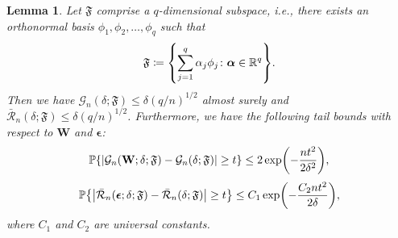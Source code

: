 \documentclass[11pt]{article}
\newtheorem{lemma}[theorem]{Lemma}
\newcommand{\bW}{\mathbf{W}}
\newcommand{\balpha}{\boldsymbol{\alpha}}
\newcommand{\beps}{\boldsymbol{\epsilon}}
\DeclarePairedDelimiter{\braces}{\lbrace}{\rbrace}
\DeclarePairedDelimiter{\paren}{(}{)}
\DeclarePairedDelimiter{\abs}{|}{|}
\newcommand{\R}{\mathbb{R}}
\renewcommand{\P}{\mathbb{P}}
\newcommand{\nsamples}{n}
\newcommand{\funcclass}{\mathfrak{F}}
\begin{document}
\begin{lemma}
\label{lem:linear_subspace_complexity}
    Let $\funcclass$ comprise a $q$-dimensional subspace, i.e., there exists an orthonormal basis $\phi_1,\phi_2,\ldots,\phi_q$ such that
    \begin{equation}
        \funcclass \coloneqq \braces*{\sum_{j=1}^q \alpha_j \phi_j \colon \balpha \in \R^q}.
    \end{equation}
    Then we have $\mathcal{G}_n(\delta;\funcclass) \leq \delta(q/\nsamples)^{1/2}$ almost surely and $\bar{\mathcal{R}}_n(\delta;\funcclass) \leq \delta(q/\nsamples)^{1/2}$.
    Furthermore, we have the following tail bounds with respect to $\bW$ and $\beps$:
    \begin{equation}
    \label{eq:local_Gaussian_complexity_concentration}
        \P\braces*{\abs*{\mathcal{G}_n(\bW; \delta;\funcclass) - \mathcal{G}_n(\delta;\funcclass)} \geq t} \leq 2\exp\paren*{-\frac{nt^2}{2\delta^2}},
    \end{equation}
    \begin{equation}
    \label{eq:local_Rademacher_complexity_concentration}
        \P\braces*{\abs*{\bar{\mathcal{R}}_n(\beps;\delta;\funcclass) - \bar{\mathcal{R}}_n(\delta;\funcclass)} \geq t} \leq C_1\exp\paren*{-\frac{C_2nt^2}{2\delta}},
    \end{equation}
    where $C_1$ and $C_2$ are universal constants.
\end{lemma}
\end{document}
